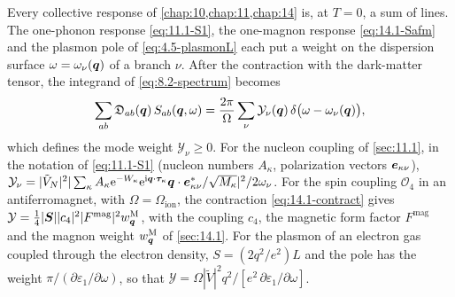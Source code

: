 Every collective response of \cref{chap:10,chap:11,chap:14} is, at $T = 0$, a sum of lines. The one-phonon response \cref{eq:11.1-S1}, the one-magnon response \cref{eq:14.1-Safm} and the plasmon pole of \cref{eq:4.5-plasmonL} each put a weight on the dispersion surface $\omega = \omega_\nu(\bm{q})$ of a branch $\nu$. After the contraction with the dark-matter tensor, the integrand of \cref{eq:8.2-spectrum} becomes
\begin{equation}
  \sum_{ab}\mathfrak{D}_{ab}(\bm{q})\,S_{ab}(\bm{q},\omega) = \frac{2\pi}{\Omega}\sum_\nu\mathcal{Y}_\nu(\bm{q})\,\delta\bigl(\omega - \omega_\nu(\bm{q})\bigr) ,
  \label{eq:17.3-lines}
\end{equation}
which defines the mode weight $\mathcal{Y}_\nu \ge 0$. For the nucleon coupling of \cref{sec:11.1}, in the notation of \cref{eq:11.1-S1} (nucleon numbers $A_\kappa$, polarization vectors $\bm{e}_{\kappa\nu}$), $\mathcal{Y}_\nu = |\tilde V_N|^2|\sum_\kappa A_\kappa\mathrm{e}^{-W_\kappa}\mathrm{e}^{\mathrm{i}\bm{q}\cdot\bm{\tau}_\kappa}\bm{q}\cdot\bm{e}^*_{\kappa\nu}/\sqrt{M_\kappa}|^2/2\omega_\nu$. For the spin coupling $\mathcal{O}_4$ in an antiferromagnet, with $\Omega = \Omega_{\mathrm{ion}}$, the contraction \cref{eq:14.1-contract} gives $\mathcal{Y} = \tfrac14|\bm{S}||c_4|^2|F^{\mathrm{mag}}|^2w^{\mathrm{M}}_{\bm{q}}$, with the coupling $c_4$, the magnetic form factor $F^{\mathrm{mag}}$ and the magnon weight $w^{\mathrm{M}}_{\bm{q}}$ of \cref{sec:14.1}. For the plasmon of an electron gas coupled through the electron density, $S = (2q^2/e^2)L$ and the pole has the weight $\pi/(\partial\varepsilon_1/\partial\omega)$, so that $\mathcal{Y} = \Omega|\tilde V|^2q^2/[e^2\,\partial\varepsilon_1/\partial\omega]$.

